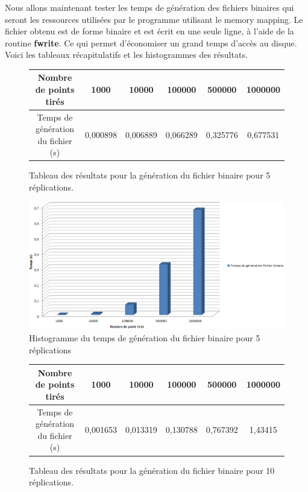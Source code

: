 \documentclass[a4paper,11pt]{report}
\begin{document}
\normalsize{
Nous allons maintenant tester les temps de génération des fichiers binaires qui seront les ressources utilisées par le programme utilisant le memory mapping. Le fichier obtenu est de forme binaire et est écrit en une seule ligne, à l'aide de la routine {\bf fwrite}. Ce qui permet d'économiser un grand temps d'accès au disque. Voici les tableaux récapitulatifs et les histogrammes des résultats. \\
}

\vspace{0.5cm}

\begin{figure}[h]
\begin{center}
\begin{tabular}{|c|c|c|c|c|c|}
\hline
Nombre de points tirés & 1000 & 10000 & 100000 & 500000 & 1000000 \\
\hline
Temps de génération du fichier (s) & 0,000898 & 0,006889 & 0,066289 & 0,325776 & 0,677531\\
\hline
\end{tabular}
\end{center}
\caption{Tableau des résultats pour la génération du fichier binaire pour 5 réplications.}
\end{figure}

\clearpage

\begin{figure}[!h]
   \begin{center}
   \includegraphics[scale = 0.65]{grapheGenerationfichier5.PNG}
   \end{center}
  \caption{Histogramme du temps de génération du fichier binaire pour 5 réplications}
\end{figure}

\vspace{0.5cm}

\begin{figure}[h]
\begin{center}
\begin{tabular}{|c|c|c|c|c|c|}
\hline
Nombre de points tirés & 1000 & 10000 & 100000 & 500000 & 1000000 \\
\hline
Temps de génération du fichier (s) & 0,001653 & 0,013319 & 0,130788 & 0,767392 & 1,43415\\
\hline
\end{tabular}
\end{center}
\caption{Tableau des résultats pour la génération du fichier binaire pour 10 réplications.}
\end{figure}
\end{document}

